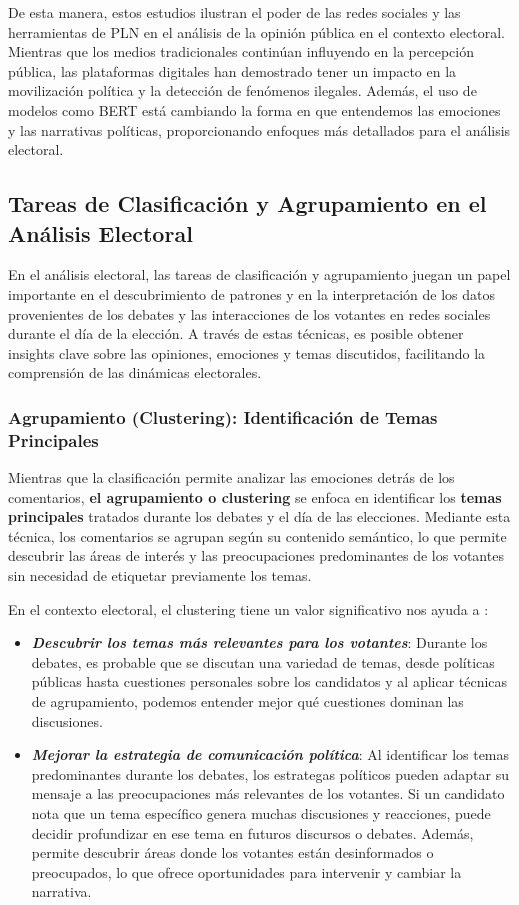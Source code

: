 \documentclass[10pt, a4paper]{article}
\begin{document}
	De esta manera, estos estudios ilustran el poder de las redes sociales y las herramientas de PLN en el análisis de la opinión pública en el contexto electoral. Mientras que los medios tradicionales continúan influyendo en la percepción pública, las plataformas digitales han demostrado tener un impacto en la movilización política y la detección de fenómenos ilegales. Además, el uso de modelos como BERT está cambiando la forma en que entendemos las emociones y las narrativas políticas, proporcionando enfoques más detallados para el análisis electoral.
	
	
	\subsection{Tareas de Clasificación y Agrupamiento en el Análisis Electoral}
	En el análisis electoral, las tareas de clasificación y agrupamiento juegan un papel importante en el descubrimiento de patrones y en la interpretación de los datos provenientes de los debates y las interacciones de los votantes en redes sociales durante el día de la elección. A través de estas técnicas, es posible obtener insights clave sobre las opiniones, emociones y temas discutidos, facilitando la comprensión de las dinámicas electorales.
	
	\subsubsection{Agrupamiento (Clustering): Identificación de Temas Principales}
	Mientras que la clasificación permite analizar las emociones detrás de los comentarios, \textbf{el agrupamiento o clustering} se enfoca en identificar los \textbf{temas principales} tratados durante los debates y el día de las elecciones. Mediante esta técnica, los comentarios se agrupan según su contenido semántico, lo que permite descubrir las áreas de interés y las preocupaciones predominantes de los votantes sin necesidad de etiquetar previamente los temas.
	
	En el contexto electoral, el clustering tiene un valor significativo nos ayuda a :
	
	\begin{itemize}
		\item \textbf{\textit{Descubrir los temas más relevantes para los votantes}}: Durante los debates, es probable que se discutan una variedad de temas, desde políticas públicas hasta cuestiones personales sobre los candidatos y al aplicar técnicas de agrupamiento, podemos entender mejor qué cuestiones dominan las discusiones.
		\item \textbf{\textit{Mejorar la estrategia de comunicación política}}: Al identificar los temas predominantes durante los debates, los estrategas políticos pueden adaptar su mensaje a las preocupaciones más relevantes de los votantes. Si un candidato nota que un tema específico genera muchas discusiones y reacciones, puede decidir profundizar en ese tema en futuros discursos o debates. Además, permite descubrir áreas donde los votantes están desinformados o preocupados, lo que ofrece oportunidades para intervenir y cambiar la narrativa.
	\end{itemize}
	
\end{document}
